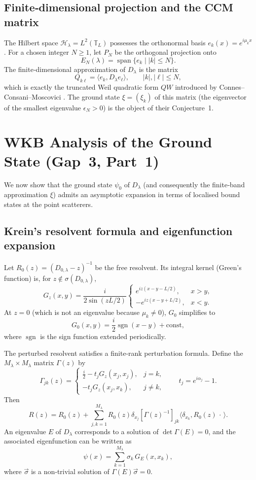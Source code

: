 \documentclass[12pt,a4paper]{article}
\newcommand{\T}{\mathbb{T}}
\newcommand{\sgn}{\operatorname{sgn}}
\begin{document}
\subsection{Finite‑dimensional projection and the CCM matrix}
The Hilbert space $\mathcal{H}_\lambda = L^2(\T_L)$ possesses the orthonormal basis $e_k(x) = e^{i\mu_k x}$.  For a chosen integer $N\ge 1$, let $P_N$ be the orthogonal projection onto
\[
E_N(\lambda) = \operatorname{span}\{e_k \mid |k|\le N\}.
\]
The finite‑dimensional approximation of $D_\lambda$ is the matrix
\[
Q_{k\ell} = \langle e_k, D_\lambda e_\ell\rangle,\qquad |k|,|\ell|\le N,
\]
which is exactly the truncated Weil quadratic form $QW$ introduced by Connes--Consani--Moscovici \cite{CCM2025}.  The ground state $\xi = (\xi_k)$ of this matrix (the eigenvector of the smallest eigenvalue $\epsilon_N>0$) is the object of their Conjecture~1.

\section{WKB Analysis of the Ground State (Gap~3, Part~1)}
We now show that the ground state $\psi_0$ of $D_\lambda$ (and consequently the finite‑band approximation $\xi$) admits an asymptotic expansion in terms of localised bound states at the point scatterers.

\subsection{Krein's resolvent formula and eigenfunction expansion}
Let $R_0(z) = (D_{0,\lambda}-z)^{-1}$ be the free resolvent.  Its integral kernel (Green's function) is, for $z\notin\sigma(D_{0,\lambda})$,
\[
G_z(x,y) = \frac{i}{2\sin(zL/2)}
\begin{cases}
 e^{iz(x-y-L/2)}, & x>y,\\
 -e^{iz(x-y+L/2)}, & x<y.
\end{cases}
\]
At $z=0$ (which is not an eigenvalue because $\mu_k\neq0$), $G_0$ simplifies to
\[
G_0(x,y) = \frac{i}{2}\sgn(x-y) + \text{const},
\]
where $\sgn$ is the sign function extended periodically.

The perturbed resolvent satisfies a finite‑rank perturbation formula.  Define the $M_\lambda\times M_\lambda$ matrix $\Gamma(z)$ by
\[
\Gamma_{jk}(z) =
\begin{cases}
\frac{i}{2} - t_j G_z(x_j,x_j), & j=k,\\
-t_j G_z(x_j,x_k), & j\neq k,
\end{cases}
\qquad t_j = e^{i\alpha_j}-1.
\]
Then
\[
R(z) = R_0(z) + \sum_{j,k=1}^{M_\lambda} R_0(z)\delta_{x_j} [\Gamma(z)^{-1}]_{jk}\langle\delta_{x_k}, R_0(z)\,\cdot\,\rangle.
\tag{4}
\]
An eigenvalue $E$ of $D_\lambda$ corresponds to a solution of $\det\Gamma(E)=0$, and the associated eigenfunction can be written as
\[
\psi(x) = \sum_{k=1}^{M_\lambda} \sigma_k \, G_E(x,x_k),
\]
where $\vec{\sigma}$ is a non‑trivial solution of $\Gamma(E)\vec{\sigma}=0$.
\end{document}
